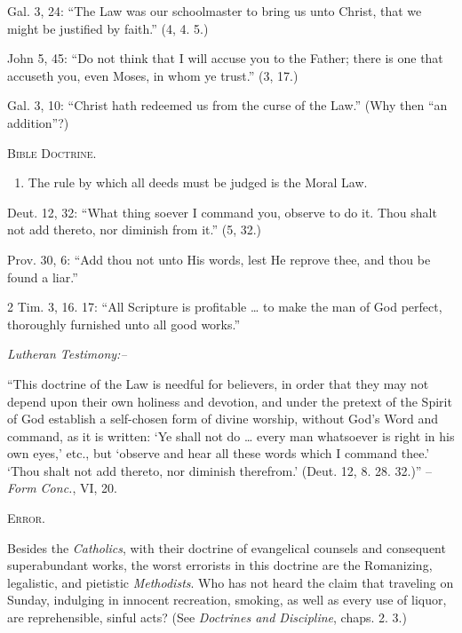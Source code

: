 \documentclass[
]{book}
\providecommand{\tightlist}{%
  \setlength{\itemsep}{0pt}\setlength{\parskip}{0pt}}
\begin{document}
Gal. 3, 24: ``The Law was our schoolmaster to bring us unto Christ, that we might be justified by faith.'' (4, 4. 5.)

John 5, 45: ``Do not think that I will accuse you to the Father; there is one that accuseth you, even Moses, in whom ye trust.'' (3, 17.)

Gal. 3, 10: ``Christ hath redeemed us from the curse of the Law.'' (Why then ``an addition''?)

\begin{center}
\textsc{Bible Doctrine.}
\end{center}

\begin{enumerate}
\def\labelenumi{\alph{enumi}.}
\setcounter{enumi}{3}
\tightlist
\item
  The rule by which all deeds must be judged is the Moral Law.
\end{enumerate}

Deut. 12, 32: ``What thing soever I command you, observe to do it. Thou shalt not add thereto, nor diminish from it.'' (5, 32.)

Prov. 30, 6: ``Add thou not unto His words, lest He reprove thee, and thou be found a liar.''

2 Tim. 3, 16. 17: ``All Scripture is profitable \ldots{} to make the man of God perfect, thoroughly furnished unto all good works.''

\begin{center}
\textsl{Lutheran Testimony:--}
\end{center}

``This doctrine of the Law is needful for believers, in order that they may not depend upon their own holiness and devotion, and under the pretext of the Spirit of God establish a self-chosen form of divine worship, without God's Word and command, as it is written: `Ye shall not do \ldots{} every man whatsoever is right in his own eyes,' etc., but `observe and hear all these words which I command thee.' `Thou shalt not add thereto, nor diminish therefrom.' (Deut. 12, 8. 28. 32.)'' -- \emph{Form Conc.}, VI, 20.

\begin{center}
\textsc{Error.}
\end{center}

Besides the \emph{Catholics}, with their doctrine of evangelical counsels and consequent superabundant works, the worst errorists in this doctrine are the Romanizing, legalistic, and pietistic \emph{Methodists}. Who has not heard the claim that traveling on Sunday, indulging in innocent recreation, smoking, as well as every use of liquor, are reprehensible, sinful acts? (See \emph{Doctrines and Discipline}, chaps. 2. 3.)
\end{document}
